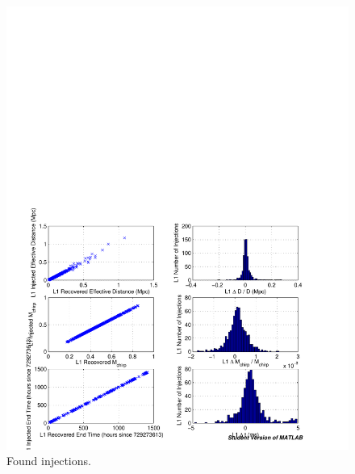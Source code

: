 \begin{figure}[p]
\begin{center}
\includegraphics[width=\textwidth]{analysis/figures/l1_param_error}
\end{center}
\caption{\label{f:pipeline}%
Found injections.
}
\end{figure}

